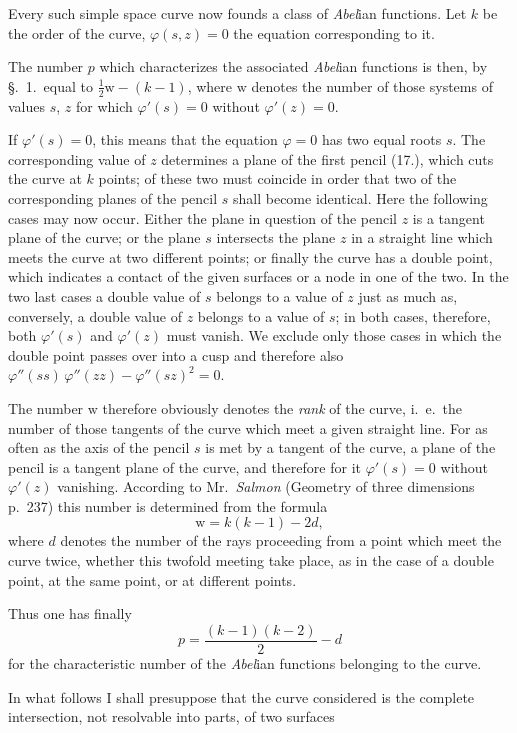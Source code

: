 \documentclass{article}
\begin{document}
Every such simple space curve now founds a class of \emph{Abel}ian functions. Let $k$ be the order of the curve, $\varphi(s,z)=0$ the equation corresponding to it.


The number $p$ which characterizes the associated \emph{Abel}ian functions is then, by §.~1.\ equal to $\tfrac{1}{2}\mathrm{w}-(k-1)$, where $\mathrm{w}$ denotes the number of those systems of values $s$, $z$ for which $\varphi'(s)=0$ without $\varphi'(z)=0$.

If $\varphi'(s)=0$, this means that the equation $\varphi=0$ has two equal roots $s$. The corresponding value of $z$ determines a plane of the first pencil (17.), which cuts the curve at $k$ points; of these two must coincide in order that two of the corresponding planes of the pencil $s$ shall become identical. Here the following cases may now occur. Either the plane in question of the pencil $z$ is a tangent plane of the curve; or the plane $s$ intersects the plane $z$ in a straight line which meets the curve at two different points; or finally the curve has a double point, which indicates a contact of the given surfaces or a node in one of the two. In the two last cases a double value of $s$ belongs to a value of $z$ just as much as, conversely, a double value of $z$ belongs to a value of $s$; in both cases, therefore, both $\varphi'(s)$ and $\varphi'(z)$ must vanish. We exclude only those cases in which the double point passes over into a cusp and therefore also $\varphi''(ss)\,\varphi''(zz)-\varphi''(sz)^{2}=0$.

The number $\mathrm{w}$ therefore obviously denotes the \emph{rank} of the curve, i.\ e.\ the number of those tangents of the curve which meet a given straight line. For as often as the axis of the pencil $s$ is met by a tangent of the curve, a plane of the pencil is a tangent plane of the curve, and therefore for it $\varphi'(s)=0$ without $\varphi'(z)$ vanishing. According to Mr.\ \emph{Salmon} (Geometry of three dimensions p.\ 237) this number is determined from the formula
\[
\mathrm{w} = k(k-1)-2d,
\]
where $d$ denotes the number of the rays proceeding from a point which meet the curve twice, whether this twofold meeting take place, as in the case of a double point, at the same point, or at different points.

Thus one has finally
\[
p = \frac{(k-1)(k-2)}{2}-d
\]
for the characteristic number of the \emph{Abel}ian functions belonging to the curve.

In what follows I shall presuppose that the curve considered is the complete intersection, not resolvable into parts, of two surfaces
\end{document}
